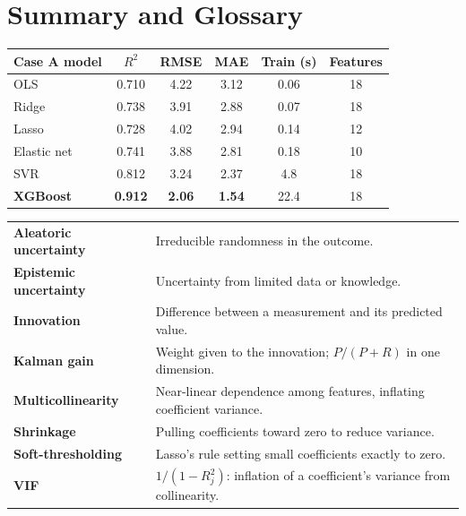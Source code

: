 \documentclass[11pt]{article}
\begin{document}
\section{Summary and Glossary}
\begin{center}\small\renewcommand{\arraystretch}{1.2}
\begin{tabular}{lccccc}\toprule Case A model & $R^2$ & RMSE & MAE & Train (s) & Features\\\midrule OLS & 0.710 & 4.22 & 3.12 & 0.06 & 18\\ Ridge & 0.738 & 3.91 & 2.88 & 0.07 & 18\\ Lasso & 0.728 & 4.02 & 2.94 & 0.14 & 12\\ Elastic net & 0.741 & 3.88 & 2.81 & 0.18 & 10\\ SVR & 0.812 & 3.24 & 2.37 & 4.8 & 18\\ \textbf{XGBoost} & \textbf{0.912} & \textbf{2.06} & \textbf{1.54} & 22.4 & 18\\\bottomrule\end{tabular}\end{center}
\begin{center}\small\renewcommand{\arraystretch}{1.2}
\begin{tabularx}{\textwidth}{>{\bfseries}p{3.3cm}X}\toprule
Aleatoric uncertainty & Irreducible randomness in the outcome.\\
Epistemic uncertainty & Uncertainty from limited data or knowledge.\\
Innovation & Difference between a measurement and its predicted value.\\
Kalman gain & Weight given to the innovation; $P/(P+R)$ in one dimension.\\
Multicollinearity & Near-linear dependence among features, inflating coefficient variance.\\
Shrinkage & Pulling coefficients toward zero to reduce variance.\\
Soft-thresholding & Lasso's rule setting small coefficients exactly to zero.\\
VIF & $1/(1-R_j^2)$: inflation of a coefficient's variance from collinearity.\\\bottomrule
\end{tabularx}\end{center}
\end{document}
